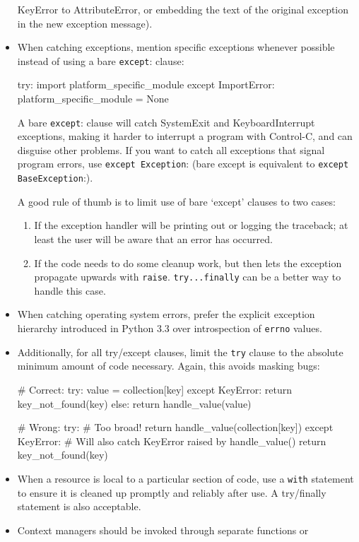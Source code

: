 \documentclass[a4paper,11pt]{article}
\begin{document}
\begin{itemize}
KeyError to AttributeError, or embedding the text of the original exception 
in the new exception message).
\item When catching exceptions, mention specific exceptions whenever possible 
instead of using a bare \verb"except": clause:
\begin{python}
try:
    import platform_specific_module
except ImportError:
    platform_specific_module = None
\end{python}
A bare \verb"except": clause will catch SystemExit and KeyboardInterrupt 
exceptions, making it harder to interrupt a program with Control-C, and can 
disguise other problems. If you want to catch all exceptions that signal 
program errors, use \verb"except Exception": (bare except is equivalent to 
\verb"except BaseException":).
\par
A good rule of thumb is to limit use of bare ‘except’ clauses to two cases:
\begin{enumerate}
\item If the exception handler will be printing out or logging the traceback; 
at least the user will be aware that an error has occurred.
\item If the code needs to do some cleanup work, but then lets the exception 
propagate upwards with \verb"raise". \verb"try...finally" can be a better way 
to handle this case.
\end{enumerate}
\item When catching operating system errors, prefer the explicit exception 
hierarchy introduced in Python 3.3 over introspection of \verb"errno" values.
\item Additionally, for all try/except clauses, limit the \verb"try" clause 
to the absolute minimum amount of code necessary. Again, this avoids masking 
bugs:
\begin{python}
# Correct:
try:
    value = collection[key]
except KeyError:
    return key_not_found(key)
else:
    return handle_value(value)
\end{python}
\begin{python}
# Wrong:
try:
    # Too broad!
    return handle_value(collection[key])
except KeyError:
    # Will also catch KeyError raised by handle_value()
    return key_not_found(key)
\end{python}
\item When a resource is local to a particular section of code, use a 
\verb"with" statement to ensure it is cleaned up promptly and reliably after 
use. A try/finally statement is also acceptable.
\item Context managers should be invoked through separate functions or 

\end{itemize}
\end{document}
